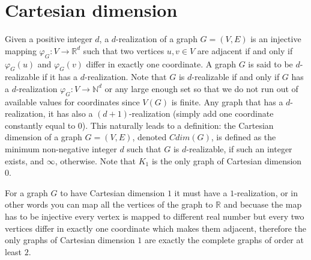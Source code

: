 \documentclass[12pt,a4paper,titlepage,openany]{report}
\begin{document}
\chapter{Cartesian dimension}\label{cdim-chapter}
Given a positive integer $d$, a $d$-realization of a graph $G=(V,E)$ is an injective mapping $\varphi_G:V\to \mathbb{R}^d$ such that two vertices $u, v \in V$ are adjacent if and only if $\varphi_G(u)$ and $\varphi_G(v)$ differ in exactly one coordinate. A graph $G$ is said to be $d$-realizable if it has a $d$-realization. Note that $G$ is $d$-realizable if and only if $G$ has a $d$-realization $\varphi_G : V \rightarrow \mathbb{N}^d$ or any large enough set so that we do not run out of available values for coordinates since $V(G)$ is finite.\newline
Any graph that has a $d$-realization, it has also a $(d+1)$-realization (simply add one coordinate constantly equal to $0$). This naturally leads to a definition: the Cartesian dimension of a graph $G = (V, E)$, denoted $Cdim(G)$, is defined as the minimum non-negative integer $d$ such that $G$ is $d$-realizable, if such an integer exists, and $\infty$, otherwise. Note that $K_1$ is the only graph of Cartesian dimension 0.\newline

For a graph $G$ to have Cartesian dimension $1$ it must have a $1$-realization, or in other words you can map all the vertices of the graph to $\mathbb{R}$ and becuase the map has to be injective every vertex is mapped to different real number but every two vertices differ in exactly one coordinate which makes them adjacent, therefore the only graphs of Cartesian dimension $1$ are exactly the complete graphs of order at least $2$.
\end{document}
